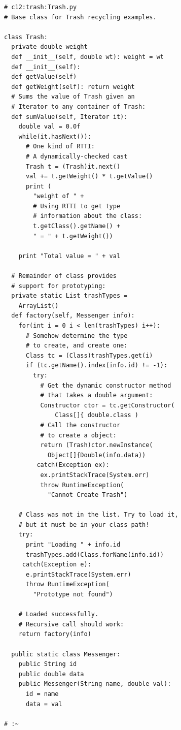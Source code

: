 \documentclass{article}
\begin{document}
\begin{lstlisting} 
# c12:trash:Trash.py 
# Base class for Trash recycling examples. 

class Trash: 
  private double weight 
  def __init__(self, double wt): weight = wt  
  def __init__(self): 
  def getValue(self) 
  def getWeight(self): return weight  
  # Sums the value of Trash given an 
  # Iterator to any container of Trash: 
  def sumValue(self, Iterator it): 
    double val = 0.0f 
    while(it.hasNext()): 
      # One kind of RTTI: 
      # A dynamically-checked cast 
      Trash t = (Trash)it.next() 
      val += t.getWeight() * t.getValue() 
      print ( 
        "weight of " + 
        # Using RTTI to get type 
        # information about the class: 
        t.getClass().getName() + 
        " = " + t.getWeight()) 
        
    print "Total value = " + val 
    
  # Remainder of class provides  
  # support for prototyping: 
  private static List trashTypes =  
    ArrayList() 
  def factory(self, Messenger info): 
    for(int i = 0 i < len(trashTypes) i++): 
      # Somehow determine the type 
      # to create, and create one: 
      Class tc = (Class)trashTypes.get(i) 
      if (tc.getName().index(info.id) != -1): 
        try: 
          # Get the dynamic constructor method 
          # that takes a double argument: 
          Constructor ctor = tc.getConstructor( 
              Class[]{ double.class ) 
          # Call the constructor   
          # to create a object: 
          return (Trash)ctor.newInstance( 
            Object[]{Double(info.data)) 
         catch(Exception ex): 
          ex.printStackTrace(System.err) 
          throw RuntimeException( 
            "Cannot Create Trash") 
            
    # Class was not in the list. Try to load it, 
    # but it must be in your class path! 
    try: 
      print "Loading " + info.id 
      trashTypes.add(Class.forName(info.id)) 
     catch(Exception e): 
      e.printStackTrace(System.err) 
      throw RuntimeException( 
        "Prototype not found") 
        
    # Loaded successfully.  
    # Recursive call should work: 
    return factory(info) 
    
  public static class Messenger: 
    public String id 
    public double data 
    public Messenger(String name, double val): 
      id = name 
      data = val 
      
# :~ 
\end{lstlisting}
\end{document}
